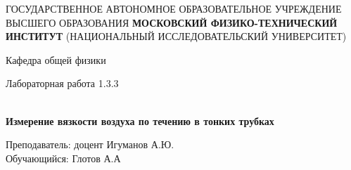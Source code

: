 \documentclass[12pt,a4paper]{article}
\author{Глотов Алексей}
\begin{document}
\newpage
\begin{center}
\footnotesize{{ГОСУДАРСТВЕННОЕ АВТОНОМНОЕ ОБРАЗОВАТЕЛЬНОЕ УЧРЕЖДЕНИЕ}\break
{ВЫСШЕГО ОБРАЗОВАНИЯ}
\break
{\bf {МОСКОВСКИЙ ФИЗИКО-ТЕХНИЧЕСКИЙ ИНСТИТУТ}}
\break
\small{(НАЦИОНАЛЬНЫЙ ИССЛЕДОВАТЕЛЬСКИЙ УНИВЕРСИТЕТ)}}
\break
\hfill \break
\hfill \break
\begin{center}
\normalsize{Кафедра общей физики}
\end{center}
\hfill \break
\hfill \break
\hfill \break
\hfill \break

\begin{center}
\normalsize {Лабораторная работа 1.3.3}
\end{center}
\hfill \break\\
\large{\textbf{Измерение вязкости воздуха по течению в тонких трубках}}
\end{center}
\begin{flushleft}
\hfill \break
\hfill \break
\hfill \break
\hfill \break
\hfill \break
\hfill \break
\hfill \break
\hfill \break
\hfill \break
\hfill \break
\hangindent=9cm
\normalsize{Преподаватель:}\hfill
\normalsize{доцент Игуманов А.Ю.}\\
\hfill \break
\normalsize{Обучающийся:}\hfill
\normalsize{Глотов А.А} \\
\hfill \break
\end{flushleft}
\hfill \break
\hfill \break
\hfill \break
\hfill \break
\hfill \break
\hfill \break
\hfill \break
\hfill \break
\hfill \break
\hfill \break
\hfill \break
\end{document}
